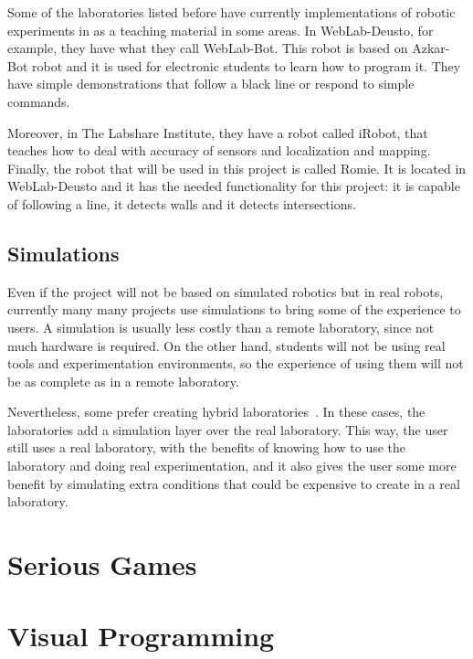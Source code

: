 Some of the laboratories listed before have currently implementations of robotic experiments in
as a teaching material in some areas. In WebLab-Deusto, for example, they have what they call
WebLab-Bot. This robot is based on Azkar-Bot robot and it is used for electronic students to learn
how to program it. They have simple demonstrations that follow a black line or respond to simple
commands.


Moreover, in The Labshare Institute, they have a robot called iRobot, that teaches how to deal with
accuracy of sensors and localization and mapping. Finally, the robot that will be used in this
project is called Romie. It is located in WebLab-Deusto and it has the needed functionality for this
project: it is capable of following a line, it detects walls and it detects intersections.


\subsection{Simulations}

Even if the project will not be based on simulated robotics but in real robots, currently many
many projects use simulations to bring some of the experience to users. A simulation is usually
less costly than a remote laboratory, since not much hardware is required. On the other hand,
students will not be using real tools and experimentation environments, so the experience of using
them will not be as complete as in a remote laboratory.

Nevertheless, some prefer creating hybrid laboratories~\cite{hybrid_labs}. In these cases, the
laboratories add a simulation layer over the real laboratory. This way, the user still uses a real
laboratory, with the benefits of knowing how to use the laboratory and doing real experimentation,
and it also gives the user some more benefit by simulating extra conditions that could be expensive
to create in a real laboratory.

\section{Serious Games}

\section{Visual Programming}

